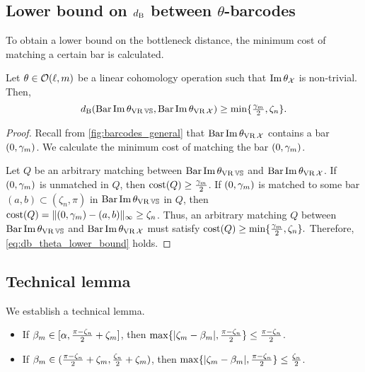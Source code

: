 
\subsection{Lower bound on $d_{\mathrm{B}}$ between $\theta$-barcodes}
\label{subsub:db_theta_lower_bound}

To obtain a lower bound on the bottleneck distance, the minimum cost of matching a certain bar is calculated. 

\medskip\proposition
Let $\theta \in \mathcal{O}(\ell, m)$ be a linear cohomology operation such that $\operatorname{Im} \theta_{\mathcal{X}}$ is non-trivial.
Then,
\begin{equation}\label{eq:db_theta_lower_bound}
    \db(\thetabarc{\VS}, \thetabarc{\cX})
    \geq \min\{\tfrac{\gamma_\degp }{2}, \zeta_n\}. %
\end{equation}

\begin{proof}
    Recall from \cref{fig:barcodes_general} that $\operatorname{Bar}\operatorname{Im} \theta_{\operatorname{VR} \mathcal{X}}$ contains a bar $(0,\gamma_m)$. 
    We calculate the minimum cost of matching the bar $(0,\gamma_m)$.
    
    Let $Q$ be an arbitrary matching between $\operatorname{Bar}\operatorname{Im} \theta_{\operatorname{VR} \mathbb{V}\mathbb{S}}$ and $\operatorname{Bar}\operatorname{Im} \theta_{\operatorname{VR} \mathcal{X}}$.
    If $(0,\gamma_m )$ is unmatched in $Q$, then $\mathrm{cost}(Q) \geq \tfrac{\gamma_m }{2}$. 
    If $(0,\gamma_m )$ is matched to some bar $(a,b) \subset (\zeta_n, \pi)$ in $\operatorname{Bar}\operatorname{Im} \theta_{\operatorname{VR} \mathbb{V}\mathbb{S}}$ in $Q$, then 
    $\mathrm{cost}(Q) =  \|(0,\gamma_m ) - (a,b)\|_\infty \geq \zeta_n$.
    Thus, an arbitrary matching $Q$ between $\operatorname{Bar}\operatorname{Im} \theta_{\operatorname{VR} \mathbb{V}\mathbb{S}}$ and $\operatorname{Bar}\operatorname{Im} \theta_{\operatorname{VR} \mathcal{X}}$ must satisfy $\mathrm{cost}(Q) \geq \min\{\tfrac{\gamma_m }{2}, \zeta_n\}.$
    Therefore, \cref{eq:db_theta_lower_bound} holds.
\end{proof}

\subsection{Technical lemma}
\label{subsub:comparison_lemma}

We establish a technical lemma.  

\medskip\lemma 
\begin{itemize}
    \item If $\beta_m \in [\alpha, \tfrac{\pi - \zeta_n}{2}+\zeta_m]$, then
            $\max\{|\zeta_m  - \beta_m |, \tfrac{\pi - \zeta_n}{2}\}
            \leq \tfrac{\pi - \zeta_n}{2}$.
    \item If $\beta_m \in (\tfrac{\pi - \zeta_n}{2}+\zeta_m, \tfrac{\zeta_n}{2}+\zeta_m)$, then
            $\max\{|\zeta_m  - \beta_m |, \tfrac{\pi - \zeta_n}{2}\}
            \leq \tfrac{\zeta_n}{2}$.
\end{itemize}

